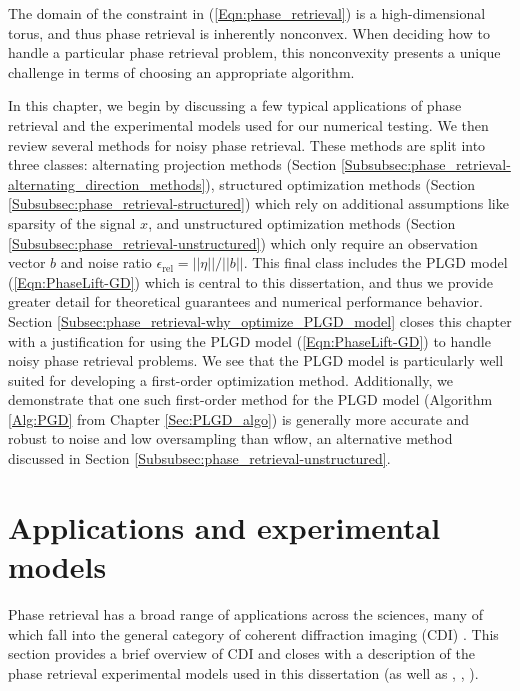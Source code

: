 The domain of the constraint in (\ref{Eqn:phase_retrieval}) is a high-dimensional torus, and thus phase retrieval is inherently nonconvex.  When deciding how to handle a particular phase retrieval problem, this  nonconvexity presents a unique challenge in terms of choosing an appropriate algorithm.  


In this chapter, we begin by discussing a few typical applications of phase retrieval and the experimental models used for our numerical testing.  
We then review several methods for noisy phase retrieval.  
These methods are split into three classes: alternating projection methods (Section \ref{Subsubsec:phase_retrieval-alternating_direction_methods}), structured optimization methods (Section \ref{Subsubsec:phase_retrieval-structured}) which rely on additional assumptions like sparsity of the signal $x$, and unstructured optimization methods (Section \ref{Subsubsec:phase_retrieval-unstructured}) which only require an observation vector $b$ and noise ratio $\epsilon_{\text{rel}} = ||\eta|| / ||b||$.  
This final class includes the PLGD model (\ref{Eqn:PhaseLift-GD}) which is central to this dissertation, and thus we provide greater detail for theoretical guarantees and numerical performance behavior.
Section \ref{Subsec:phase_retrieval-why_optimize_PLGD_model} closes this chapter with a justification for using the PLGD model (\ref{Eqn:PhaseLift-GD}) to handle noisy phase retrieval problems.
We see that the PLGD model is particularly well suited for developing a first-order optimization method.
Additionally, we demonstrate that one such first-order method for the PLGD model (Algorithm \ref{Alg:PGD} from Chapter \ref{Sec:PLGD_algo}) is generally more accurate and robust to noise and low oversampling than wflow, an alternative method discussed in Section \ref{Subsubsec:phase_retrieval-unstructured}.





\section{Applications and experimental models} 			\label{Subsec:phase_retrieval-applications}


Phase retrieval has a broad range of applications across the sciences, many of which fall into the general category of coherent diffraction imaging (CDI) \cite{miao1999extending}.  This section provides a brief overview of CDI and closes with a description of the phase retrieval experimental models used in this dissertation (as well as \cite{DBLP:journals/siamis/CandesESV13}, \cite{DBLP:journals/tit/CandesLS15}, \cite{DBLP:journals/siamsc/FriedlanderM16}).


